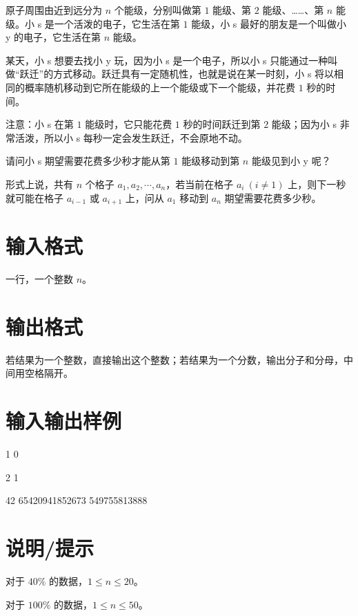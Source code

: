 \documentclass{../cpct/ctpro}
\begin{document}
原子周围由近到远分为 $n$ 个能级，分别叫做第 $1$ 能级、第 $2$ 能级、……、第 $n$ 能级。小 s 是一个活泼的电子，它生活在第 $1$ 能级，小 s 最好的朋友是一个叫做小 y 的电子，它生活在第 $n$ 能级。

某天，小 s 想要去找小 y 玩，因为小 s 是一个电子，所以小 s 只能通过一种叫做“跃迁”的方式移动。跃迁具有一定随机性，也就是说在某一时刻，小 s 将以相同的概率随机移动到它所在能级的上一个能级或下一个能级，并花费 $1$ 秒的时间。

注意：小 s 在第 $1$ 能级时，它只能花费 $1$ 秒的时间跃迁到第 $2$ 能级；因为小 s 非常活泼，所以小 s 每秒一定会发生跃迁，不会原地不动。

请问小 s 期望需要花费多少秒才能从第 $1$ 能级移动到第 $n$ 能级见到小 y 呢？

形式上说，共有 $n$ 个格子 $a_1,a_2,\cdots,a_n$，若当前在格子 $a_i~(i \neq 1)$ 上，则下一秒就可能在格子 $a_{i-1}$ 或 $a_{i+1}$ 上，问从 $a_1$ 移动到 $a_n$ 期望需要花费多少秒。

\section*{输入格式}

一行，一个整数 $n$。

\section*{输出格式}

若结果为一个整数，直接输出这个整数；若结果为一个分数，输出分子和分母，中间用空格隔开。

\section*{输入输出样例}
\testcasetab
{
    1
}
{
    0
}

\testcasetab
{
    2
}
{
    1
}

\testcasetab
{
    42
}
{
    65420941852673 549755813888
}

\section*{说明/提示}

对于 $40 \%$ 的数据，$1 \leq n \leq 20$。

对于 $100 \%$ 的数据，$1 \leq n \leq 50$。
\end{document}
